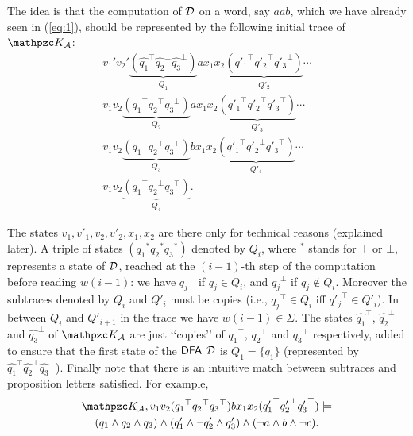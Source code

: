 The idea is that the computation of $\mathcal{D}$ on a word, say $aab$, which we have already seen in (\ref{eq:1}), should be represented by the following initial trace of $\Ku_\Au$:
\begin{equation}\begin{split}
v_1'v_2'\underbrace{(\widehat{q_1}^\top\widehat{q_2}^\bot\widehat{q_3}^\bot)}_{Q_1} a x_1x_2 \underbrace{({q'_1}^\top {q'_2}^\top {q'_3}^\bot)}_{Q'_2}\cdots\\
v_1v_2 \underbrace{({q_1}^\top {q_2}^\top {q_3}^\bot)}_{Q_2} a x_1x_2 \underbrace{({q'_1}^\top {q'_2}^\top {q'_3}^\top)}_{Q'_3} \cdots\\
v_1v_2 \underbrace{({q_1}^\top {q_2}^\top {q_3}^\top)}_{Q_3} b x_1x_2 \underbrace{({q'_1}^\top {q'_2}^\bot {q'_3}^\top)}_{Q'_4} \cdots\\
v_1v_2 \underbrace{({q_1}^\top {q_2}^\bot {q_3}^\top)}_{Q_4}.
\end{split}
\label{eq:extrack}
\end{equation}
 
The states $v_1,v'_1,v_2,v'_2,x_1,x_2$ are there only for technical reasons (explained later). 
A triple of states $({q_1}^* {q_2}^* {q_3}^*)$ denoted by $Q_i$, where $^*$ stands for $\top$ or $\bot$,  represents a state of $\mathcal{D}$, reached at the $(i-1)$-th step of the computation before reading $w(i-1)$: we have ${q_j}^\top$ if $q_j\in Q_i$, and ${q_j}^\bot$ if $q_j\not\in Q_i$.
Moreover the subtraces denoted by $Q_i$ and $Q'_i$ must be copies (i.e., ${q_j}^\top\in Q_i$ iff ${q'_j}^\top\in Q'_i$).
In between $Q_i$ and $Q'_{i+1}$ in the trace we have $w(i-1)\in\Sigma$.
The states $\widehat{q_1}^\top$, $\widehat{q_2}^\bot$ and $\widehat{q_3}^\bot$ of $\Ku_\Au$ are just \lq\lq copies\rq\rq{} of ${q_1}^\top$, ${q_2}^\bot$ and ${q_3}^\bot$ respectively, added to ensure that the first state of the $\text{\sffamily DFA}$ $\mathcal{D}$ is $Q_1=\{q_1\}$ (represented by $\widehat{q_1}^\top \widehat{q_2}^\bot \widehat{q_3}^\bot$). 
Finally note that there is an intuitive match between subtraces and proposition letters satisfied. For example,
\begin{multline*}
    \Ku_\Au, v_1v_2 ({q_1}^\top {q_2}^\top {q_3}^\top) b x_1x_2 ({q'_1}^\top {q'_2}^\bot {q'_3}^\top)\models\\
    (q_1\wedge q_2\wedge q_3)\wedge (q'_1\wedge\neg q'_2\wedge q'_3)\wedge (\neg a \wedge b \wedge \neg c).
\end{multline*}

